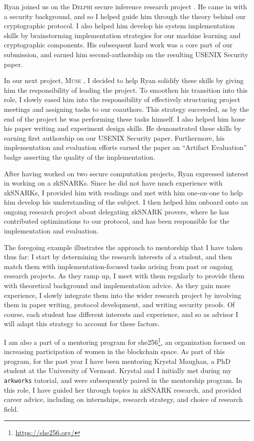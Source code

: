 \documentclass[11pt,letterpaper]{article}
\theoremstyle{definition} %
\theoremstyle{remark} %
\newcommand{\arkworks}{\texttt{arkworks}}
\begin{document}
Ryan joined us on the \textsc{Delphi} secure inference research project \cite{MishraLSZP20}. He came in with a security background, and so I helped guide him through the theory behind our cryptographic protocol. I also helped him develop his system implementation skills by brainstorming implementation strategies for our machine learning and cryptographic components. His subsequent hard work was a core part of our submission, and earned him second-authorship on the resulting USENIX Security paper.

In our next project, \textsc{Muse} \cite{LehmkuhlMSP21}, I decided to help Ryan solidify these skills by giving him the responsibility of leading the project. To smoothen his transition into this role, I slowly eased him into the responsibility of effectively structuring project meetings and assigning tasks to our coauthors. This strategy succeeded, as by the end of the project he was performing these tasks himself. I also helped him hone his paper writing and experiment design skills. He demonstrated these skills by earning first authorship on our USENIX Security paper. Furthermore, his implementation and evaluation efforts earned the paper an ``Artifact Evaluation'' badge asserting the quality of the implementation. 

After having worked on two secure computation projects, Ryan expressed interest in working on a zkSNARKs. Since he did not have much experience with zkSNARKs, I provided him with readings and met with him one-on-one to help him develop his understanding of the subject. I then helped him onboard onto an ongoing research project about delegating zkSNARK provers, where he has contributed optimizations to our protocol, and has been responsible for the implementation and evaluation.

The foregoing example illustrates the approach to mentorship that I have taken thus far: I start by determining the research interests of a student, and then match them with implementation-focused tasks arising from past or ongoing research projects. As they ramp up, I meet with them regularly to provide them with theoretical background and implementation advice. As they gain more experience, I slowly integrate them into the wider research project by involving them in paper writing, protocol development, and writing security proofs. Of course, each student has different interests and experience, and so as advisor I will adapt this strategy to account for these factors.

I am also a part of a mentoring program for she256\footnote{\url{https://she256.org/}}, an organization focused on increasing participation of women in the blockchain space. As part of this program, for the past year I have been mentoring Krystal Maughan, a PhD student at the University of Vermont. Krystal and I initially met during my \arkworks{} tutorial, and were subsequently paired in the mentorship program. In this role, I have guided her through topics in zkSNARK research, and provided career advice, including on internships, research strategy, and choice of research field.
\end{document}
